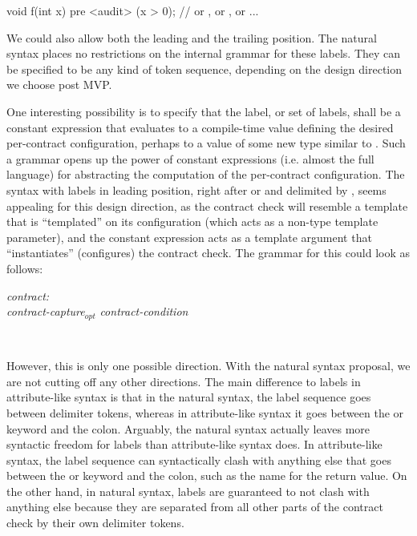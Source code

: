 \begin{codeblock}
void f(int x)
  pre <audit> (x > 0);    // or , or \tcode{[\{audit\}]}, or  ...
\end{codeblock}

We could also allow both the leading and the trailing position. The natural syntax places no restrictions on the internal grammar for these labels. They can be specified to be any kind of token sequence, depending on the design direction we choose post MVP.

One interesting possibility is to specify that the label, or set of labels, shall be a constant expression that evaluates to a compile-time value defining the desired per-contract configuration, perhaps to a value of some new type  similar to . Such a grammar opens up the power of constant expressions (i.e. almost the full language) for abstracting the computation of the per-contract configuration. The syntax with labels in leading position, right after  or  and delimited by \mbox{}, seems appealing for this design direction, as the contract check will resemble a template that is ``templated'' on its configuration (which acts as a non-type template parameter), and the constant expression acts as a template argument that ``instantiates'' (configures) the contract check. The grammar for this could look as follows:

\begin{adjustwidth}{0.5cm}{0.5cm}

\emph{contract:} \\
\phantom{~~~} \emph{contract-capture}$_{opt}$ \emph{contract-condition}

 \\
\phantom{~~~}

\end{adjustwidth}

However, this is only one possible direction. With the natural syntax proposal, we are not cutting off any other directions. The main difference to labels in attribute-like syntax is that in the natural syntax, the label sequence goes between delimiter tokens, whereas in attribute-like syntax it goes between the  or  keyword and the colon. Arguably, the natural syntax actually leaves more syntactic freedom for labels than attribute-like syntax does. In attribute-like syntax, the label sequence can syntactically clash with anything else that goes between the  or  keyword and the colon, such as the name for the return value. On the other hand, in natural syntax, labels are guaranteed to not clash with anything else because they are separated from all other parts of the contract check by their own delimiter tokens.

